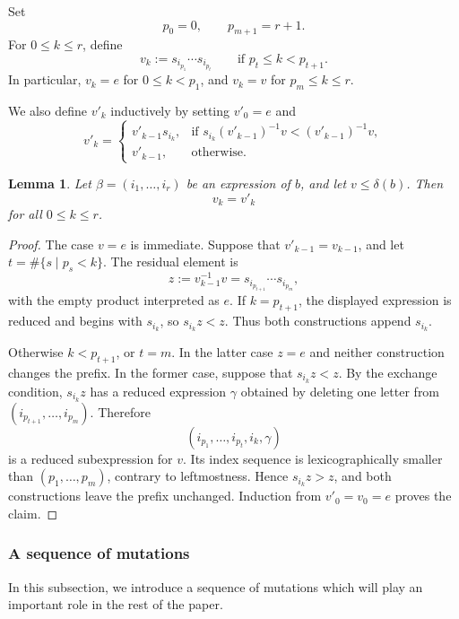 \documentclass[12pt, reqno]{amsart}
\theoremstyle{plain}
\newtheorem{lemma}[theorem]{Lemma}
\theoremstyle{definition}
\numberwithin{equation}{section}
\begin{document}
Set
\[
p_0=0,\qquad p_{m+1}=r+1.
\]
For \(0\le k\le r\), define
\[
v_k:=s_{i_{p_1}}\cdots s_{i_{p_t}}
\qquad
\text{if } p_t\le k<p_{t+1}.
\]
In particular, \(v_k=e\) for \(0\le k<p_1\), and \(v_k=v\) for
\(p_m\le k\le r\).

We also define \(v'_k\) inductively by setting \(v'_0=e\) and
\begin{equation}\label{eq:vk'}
v'_k=
\begin{cases}
v'_{k-1}s_{i_k},
& \text{if } s_{i_k}(v'_{k-1})^{-1}v < (v'_{k-1})^{-1}v,\\
v'_{k-1},
& \text{otherwise}.
\end{cases}
\end{equation}

\begin{lemma}\label{lem:vk}
Let \(\beta=(i_1,\dots,i_r)\) be an expression of \(b\), and let
\(v\le \delta(b)\). Then
\[
v_k=v'_k
\]
for all \(0\le k\le r\).
\end{lemma}

\begin{proof}
The case \(v=e\) is immediate. Suppose that \(v'_{k-1}=v_{k-1}\),
and let \(t=\#\{s\mid p_s<k\}\). The residual element is
\[
 z:=v_{k-1}^{-1}v=s_{i_{p_{t+1}}}\cdots s_{i_{p_m}},
\]
with the empty product interpreted as \(e\).
If \(k=p_{t+1}\), the displayed expression is reduced and begins
with \(s_{i_k}\), so \(s_{i_k}z<z\). Thus both constructions append
\(s_{i_k}\).

Otherwise \(k<p_{t+1}\), or \(t=m\). In the latter case \(z=e\)
and neither construction changes the prefix. In the former case,
suppose that \(s_{i_k}z<z\). By the exchange condition,
\(s_{i_k}z\) has a reduced expression \(\gamma\) obtained by deleting
one letter from \((i_{p_{t+1}},\ldots,i_{p_m})\). Therefore
\[
 (i_{p_1},\ldots,i_{p_t},i_k,\gamma)
\]
is a reduced subexpression for \(v\). Its index sequence is
lexicographically smaller than \((p_1,\ldots,p_m)\), contrary to
leftmostness. Hence \(s_{i_k}z>z\), and both constructions leave
the prefix unchanged. Induction from \(v'_0=v_0=e\) proves the claim.
\end{proof}

\subsubsection{A sequence of mutations}

In this subsection, we introduce a sequence of mutations which will play an
important role in the rest of the paper.
\end{document}
